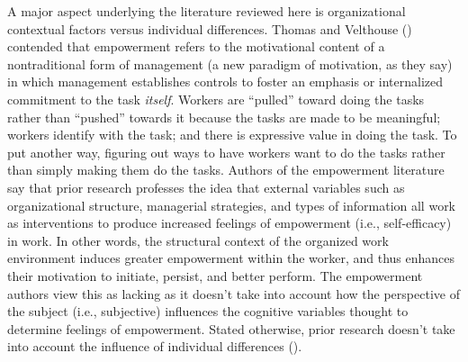 \documentclass[
  11pt,
  a4paper,
]{article}
\begin{document}
A major aspect underlying the literature reviewed here is organizational
contextual factors versus individual differences. Thomas and Velthouse
() contended that empowerment refers to
the motivational content of a nontraditional form of management (a new
paradigm of motivation, as they say) in which management establishes
controls to foster an emphasis or internalized commitment to the task
\emph{itself}. Workers are ``pulled'' toward doing the tasks rather than
``pushed'' towards it because the tasks are made to be meaningful;
workers identify with the task; and there is expressive value in doing
the task. To put another way, figuring out ways to have workers want to
do the tasks rather than simply making them do the tasks. Authors of the
empowerment literature say that prior research professes the idea that
external variables such as organizational structure, managerial
strategies, and types of information all work as interventions to
produce increased feelings of empowerment (i.e., self-efficacy) in work.
In other words, the structural context of the organized work environment
induces greater empowerment within the worker, and thus enhances their
motivation to initiate, persist, and better perform. The empowerment
authors view this as lacking as it doesn't take into account how the
perspective of the subject (i.e., subjective) influences the cognitive
variables thought to determine feelings of empowerment. Stated
otherwise, prior research doesn't take into account the influence of
individual differences ().
\end{document}
